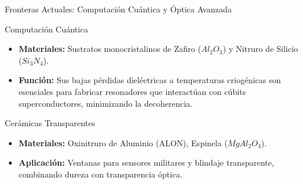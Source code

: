 \begin{frame}{Fronteras Actuales: Computación Cuántica y Óptica Avanzada}
  \begin{block}{Computación Cuántica}
    \begin{itemize}
      \item \textbf{Materiales:} Sustratos monocristalinos de Zafiro ($Al_2O_3$) 
				y Nitruro de Silicio ($Si_3N_4$).
      \item \textbf{Función:} Sus bajas pérdidas dieléctricas a temperaturas 
				criogénicas son esenciales para fabricar resonadores que interactúan 
				con cúbits superconductores, minimizando la decoherencia.
    \end{itemize}
  \end{block}
  
  \begin{block}{Cerámicas Transparentes}
    \begin{itemize}
      \item \textbf{Materiales:} Oxinitruro de Aluminio (ALON), Espinela 
				($MgAl_2O_4$).
      \item \textbf{Aplicación:} Ventanas para sensores militares y blindaje 
				transparente, combinando dureza con transparencia óptica.
    \end{itemize}
  \end{block}
\end{frame}
